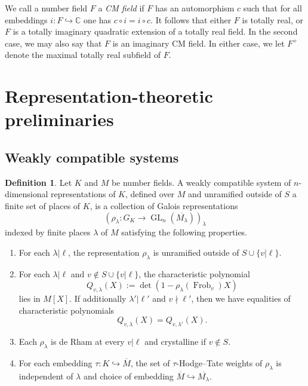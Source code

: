 \documentclass{amsart}
\theoremstyle{definition}
\newtheorem{definition}[theorem]{Definition}
\numberwithin{equation}{section} %
\newcommand{\GL}{\operatorname{GL}}
\newcommand{\Frob}{\operatorname{Frob}}
\newcommand{\bb}[1]{\mathbb{#1}}
\newcommand{\ol}[1]{\overline{#1}}
\begin{document}
We call a number field \( F \) a \emph{CM field} if $F$ has an automorphism \( c \) such that for all embeddings \( i:F\hookrightarrow\bb{C} \) one has \( c\circ i = i \circ c \). It follows that either \( F \) is totally real, or \( F \) is a totally imaginary quadratic extension of a totally real field. In the second case, we may also say that \( F \) is an imaginary CM field. In either case, we let \( F^+ \) denote the maximal totally real subfield of \( F \).

\section{Representation-theoretic preliminaries}

\subsection{Weakly compatible systems}

\begin{definition}
Let $K$ and $M$ be number fields.
A weakly compatible system of $n$-dimensional representations of $K$, defined over $M$ and unramified outside of $S$ a finite set of places of $K$, is a collection of Galois representations
\[
(\rho_\lambda: G_K \to \GL_n(\ol{M_\lambda}))_\lambda
\]
indexed by finite places $\lambda$ of $M$ satisfying the following properties.
\begin{enumerate}
    \item For each $\lambda|\ell$, the representation $\rho_\lambda$ is unramified outside of $S \cup \{v | \ell\}$. 
    \item For each $\lambda|\ell$ and $v \not\in S \cup \{v | \ell\}$, the characteristic polynomial
    \[
    Q_{v,\lambda}(X) := \det(1-\rho_\lambda(\Frob_v)X)
    \]
    lies in $M[X]$.
    If additionally $\lambda'|\ell'$ and $v \nmid \ell'$, then we have equalities of characteristic polynomials
    \[
    Q_{v,\lambda}(X) = Q_{v,\lambda'}(X).
    \]
    \item Each $\rho_\lambda$ is de Rham at every $v|\ell$ and crystalline if $v \not\in S$.
    \item For each embedding $\tau: K \hookrightarrow \ol{M}$, the set of $\tau$-Hodge--Tate weights of $\rho_\lambda$ is independent of $\lambda$ and choice of embedding $\ol{M} \hookrightarrow \ol{M_\lambda}$.
\end{enumerate}
\end{definition}
\end{document}
